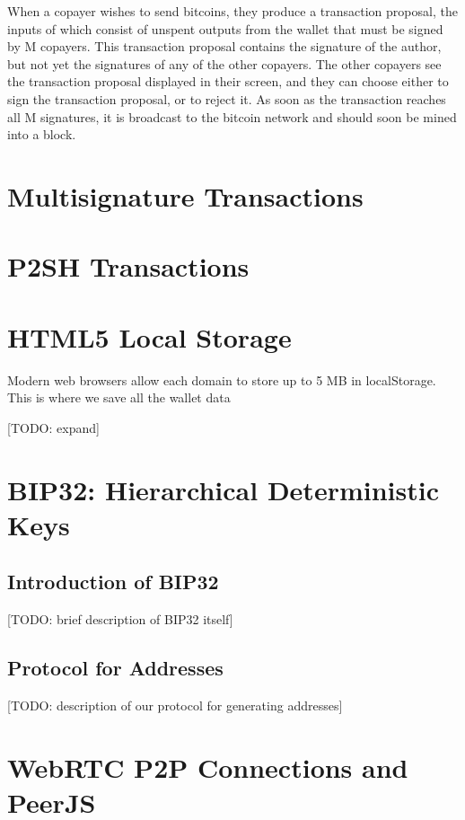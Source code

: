 \documentclass{article}
\begin{document}
When a copayer wishes to send bitcoins, they produce a transaction proposal, the inputs of which consist of unspent outputs from the wallet that must be signed by M copayers.
This transaction proposal contains the signature of the author, but not yet the signatures of any of the other copayers.
The other copayers see the transaction proposal displayed in their screen, and they can choose either to sign the transaction proposal, or to reject it.
As soon as the transaction reaches all M signatures, it is broadcast to the bitcoin network and should soon be mined into a block.

\section{Multisignature Transactions}

\section{P2SH Transactions}

\section{HTML5 Local Storage}

Modern web browsers allow each domain to store up to 5 MB in localStorage. This is where we save all the wallet data

[TODO: expand]

\section{BIP32: Hierarchical Deterministic Keys}

\subsection{Introduction of BIP32}

[TODO: brief description of BIP32 itself]

\subsection{Protocol for Addresses}

[TODO: description of our protocol for generating addresses]

\section{WebRTC P2P Connections and PeerJS}
\end{document}
